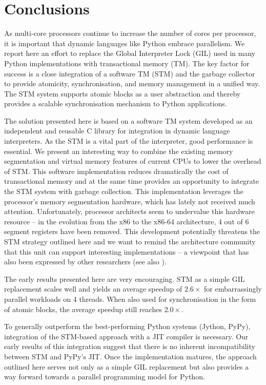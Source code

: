 \documentclass{sigplanconf}
\begin{document}
\section{Conclusions}

As multi-core processors continue to increase the number of cores per
processor, it is important that dynamic languages like Python embrace
parallelism.  We report here an effort to replace the Global
Interpreter Lock (GIL) used in many Python implementations with
transactional memory (TM). The key factor for success is a close
integration of a software TM (STM) and the garbage collector to
provide atomicity, synchronisation, and memory management in a unified
way.  The STM system supports atomic blocks as a user abstraction and
thereby provides a scalable synchronisation mechanism to Python
applications.


The solution presented here is based on a software TM system developed
as an independent and reusable C library for integration in dynamic
language interpreters. As the 
STM is a vital part of the interpreter, good performance is
essential. We present an interesting way to combine the existing
memory segmentation and virtual memory features of current CPUs to
lower the overhead of STM. This software implementation reduces
dramatically the cost of transactional memory and at the same time
provides an opportunity to integrate the STM system with garbage
collection.  This implementation leverages the processor's memory
segmentation hardware, which has lately not received much attention.
Unfortunately, processor architects seem to
undervalue this hardware resource -- in the evolution from the x86 to
the x86{-}64 architecture, 4 out of 6 segment registers have been
removed. This development potentially threatens the STM strategy
outlined here and we want to remind the architecture community that
this unit can support interesting implementations -- a viewpoint that
has also been expressed by other researchers (see also
\cite{bennet10}).

The early results presented here are very encouraging. STM as a simple
GIL replacement scales well and yields an average speedup of $2.6\times$ for
embarrassingly parallel workloads on 4 threads.  When also used for
synchronisation in the form of atomic blocks, the average speedup
still reaches $2.0\times$.

To generally outperform the best-performing Python systems (Jython,
PyPy), integration of the STM-based approach with a JIT compiler is
necessary. Our early results of this integration suggest that there is
no inherent incompatibility between STM and PyPy's JIT.  Once the
implementation matures, the approach outlined here serves not only as a
simple GIL replacement but also provides a way forward towards a
parallel programming model for Python.
\end{document}
